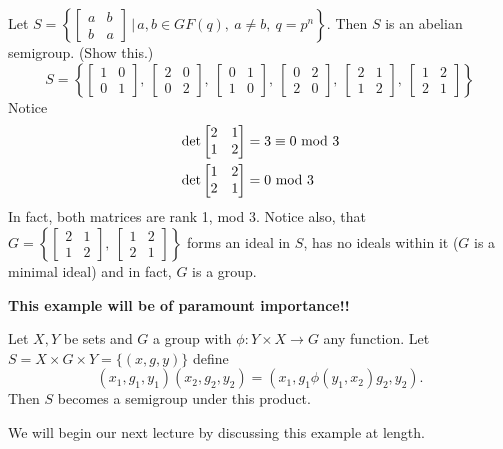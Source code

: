 \begin{example}	\label{exm:2.3}
Let $S = \left\{ \begin{bmatrix} a &b \\ b &a
     \end{bmatrix} \, \big| \, a,b \in GF(q), \ a \not= b, \ q = p^n
     \right\}$.  Then $S$ is an abelian semigroup.  (Show this.)
\[
     S = \left\{
         \begin{bmatrix} 1 &0 \\ 0 &1 \end{bmatrix}, \
         \begin{bmatrix} 2 &0 \\ 0 &2 \end{bmatrix}, \
         \begin{bmatrix} 0 &1 \\ 1 &0 \end{bmatrix}, \
         \begin{bmatrix} 0 &2 \\ 2 &0 \end{bmatrix}, \
         \begin{bmatrix} 2 &1 \\ 1 &2 \end{bmatrix}, \
         \begin{bmatrix} 1 &2 \\ 2 &1 \end{bmatrix} \right\}
\]
Notice
\[
\begin{aligned}
     &\det \begin{bmatrix} 2 &1 \\ 1 &2 \end{bmatrix}
            = 3 \equiv 0 \hbox{ mod } 3               \\
     &\det \begin{bmatrix} 1 &2 \\ 2 &1 \end{bmatrix}
            = 0 \hbox{ mod } 3                        \\
     \end{aligned}
\]
In fact, both matrices are rank 1, mod 3.  
Notice also, that $G = \left\{ \begin{bmatrix} 2 &1 \\ 1 &2 \end{bmatrix}, \
\begin{bmatrix} 1 &2 \\ 2 &1 \end{bmatrix} \right\}$ forms an ideal in $S$, has
no ideals within it ($G$ is a minimal ideal) and in fact, $G$ is a group.
\end{example}

\begin{example}		\label{exm:2.4}  
{\bf This example will be of paramount importance!!}

Let $X,Y$ be sets and $G$ a group with $\phi: Y \times X \to G$ any
function.  Let $S = X \times G \times Y = \{(x,g,y)\}$ define
\[
  (x_1,g_1,y_1)(x_2,g_2,y_2) = (x_1,g_1 \phi(y_1,x_2) g_2,y_2).
\]
Then $S$ becomes a semigroup under this product.
\end{example}

We will begin our next lecture by discussing this example at length.
